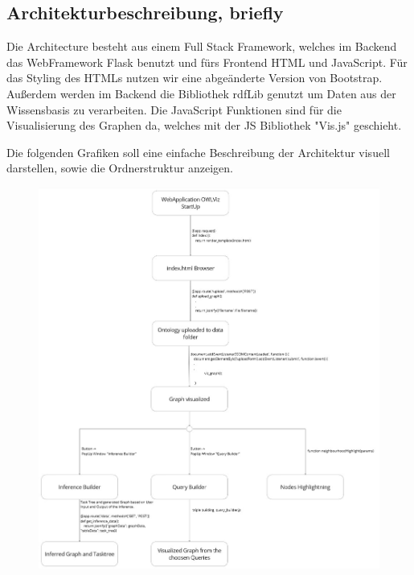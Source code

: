 \subsection*{Architekturbeschreibung, briefly}

Die Architecture besteht aus einem Full Stack Framework, welches im Backend das WebFramework Flask benutzt und fürs Frontend HTML und JavaScript. Für das Styling des HTMLs nutzen wir eine abgeänderte Version von Bootstrap. Außerdem werden im Backend die Bibliothek rdfLib genutzt um Daten aus der Wissensbasis zu verarbeiten. Die JavaScript Funktionen sind für die Visualisierung des Graphen da, welches mit der JS Bibliothek "Vis.js" geschieht.

Die folgenden Grafiken soll eine einfache Beschreibung der Architektur visuell darstellen, sowie die Ordnerstruktur anzeigen.
\begin{figure}[!ht]
    \includegraphics[scale=0.35]{Graphics/OWLViz_architecture.jpg}
    \end{figure}


